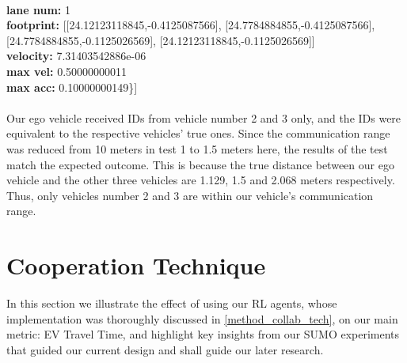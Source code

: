 \begin{enumerate}
\begin{itemize}
    \\\hspace*{10mm} \textbf{lane num:} 1
    \\\hspace*{10mm} \textbf{footprint:} [[24.12123118845,-0.4125087566], [24.7784884855,-0.4125087566], [24.7784884855,-0.1125026569], [24.12123118845,-0.1125026569]]
    \\\hspace*{10mm} \textbf{velocity:} 7.31403542886e-06
    \\\hspace*{10mm} \textbf{max vel:} 0.50000000011
    \\\hspace*{10mm} \textbf{max acc:} 0.10000000149\}] \\ \\
            Our ego vehicle received IDs from vehicle number 2 and 3 only, and the IDs were equivalent to the respective vehicles’ true ones. Since the communication range was reduced from 10 meters in test 1 to 1.5 meters here, the results of the test match the expected outcome. This is because the true distance between our ego vehicle and the other three vehicles are 1.129, 1.5 and 2.068 meters respectively. Thus, only vehicles number 2 and 3 are within our vehicle’s communication range.
        \end{itemize}
\end{enumerate}

\section{Cooperation Technique}
\label{sec:RL_Results}
In this section we illustrate the effect of using our RL agents, whose implementation was thoroughly discussed in \ref{method_collab_tech}, on our main metric: EV Travel Time, and highlight key insights from our SUMO experiments that guided our current design and shall guide our later research.

